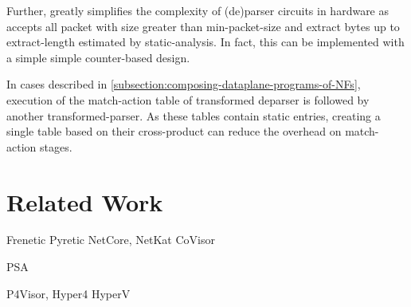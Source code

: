 \documentclass[letterpaper,twocolumn,10pt]{article}
\begin{document}
Further, \ucomp greatly simplifies the complexity of (de)parser
circuits in hardware as \ucomp accepts all packet with size greater
than min-packet-size and extract bytes up to extract-length estimated
by static-analysis. In fact, this can be implemented with a simple
simple counter-based design.


 In cases described in
\cref{subsection:composing-dataplane-programs-of-NFs}, execution of
the match-action table of transformed deparser is followed by another
transformed-parser. As these tables contain static entries, creating a
single table based on their cross-product can reduce the overhead on
match-action stages.







\section{Related Work}

Frenetic Pyretic NetCore, NetKat CoVisor

PSA

P4Visor, Hyper4 HyperV
\end{document}
